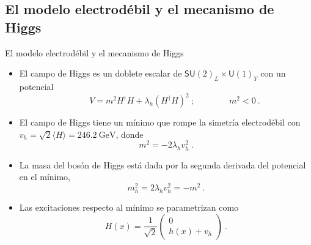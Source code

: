 \documentclass{beamer}
\begin{document}
\subsection{El modelo electrodébil y el mecanismo de Higgs}
\begin{frame}{El modelo electrodébil y el mecanismo de Higgs}
\begin{itemize}
\item<only@1> El campo de Higgs es un doblete escalar de $\mathsf{SU}(2)_L \times \mathsf{U}(1)_Y$ con un potencial
\begin{equation}\label{eq:HiggsPotential}
\qquad V = m^2 H^\dagger H + \lambda_h (H^\dagger H)^2\ ; \qquad\qquad m^2<0\ .
\end{equation}
\item<only@1> El campo de Higgs tiene un mínimo que rompe la simetría electrodébil con $v_h = \sqrt{2}\langle H\rangle =\SI{246.2}{\giga\electronvolt}$, donde 
\begin{equation}
m^2 = -2\lambda_h v_h^2\ .
\end{equation}
\item<only@1> La masa del bosón de Higgs está dada por la segunda derivada del potencial en el mínimo, 
\begin{equation}
m_h^2 = 2 \lambda_h v_h^2=-m^2\ .
\end{equation}
\item<only@1> Las excitaciones respecto al mínimo se parametrizan como
\begin{equation}
H(x) =\frac{1}{\sqrt{2}} \begin{pmatrix}0 \\ h(x) +  v_h\end{pmatrix}\ . \label{eq:HiggsExpansion}
\end{equation}


\end{itemize}
\end{frame}
\end{document}
